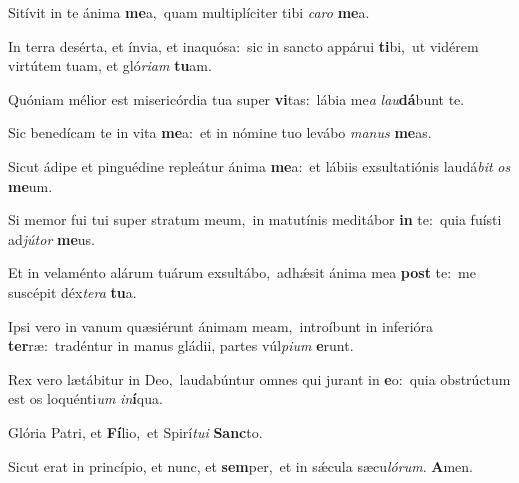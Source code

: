 Sitívit in te ánima \textbf{me}a,~\redgreheightstar quam multiplíciter tibi \textit{ca}\textit{ro} \textbf{me}a.

In terra desérta, et ínvia, et inaquósa:~\reddagger sic in sancto appárui \textbf{ti}bi,~\redgreheightstar ut vidérem virtútem tuam, et gló\textit{ri}\textit{am} \textbf{tu}am.

Quóniam mélior est misericórdia tua super \textbf{vi}tas:~\redgreheightstar lábia me\textit{a} \textit{lau}\textbf{dá}bunt te.

Sic benedícam te in vita \textbf{me}a:~\redgreheightstar et in nómine tuo levábo \textit{ma}\textit{nus} \textbf{me}as.

Sicut ádipe et pinguédine repleátur ánima \textbf{me}a:~\redgreheightstar et lábiis exsultatiónis laudá\textit{bit} \textit{os} \textbf{me}um.

Si memor fui tui super stratum meum,~\reddagger in matutínis meditábor \textbf{in} te:~\redgreheightstar quia fuísti ad\textit{jú}\textit{tor} \textbf{me}us.

Et in velaménto alárum tuárum exsultábo,~\reddagger adhǽsit ánima mea \textbf{post} te:~\redgreheightstar me suscépit déx\textit{te}\textit{ra} \textbf{tu}a.

Ipsi vero in vanum quæsiérunt ánimam meam,~\reddagger introíbunt in inferióra \textbf{ter}ræ:~\redgreheightstar tradéntur in manus gládii, partes vúl\textit{pi}\textit{um} \textbf{e}runt.

Rex vero lætábitur in Deo,~\reddagger laudabúntur omnes qui jurant in \textbf{e}o:~\redgreheightstar quia obstrúctum est os loquénti\textit{um} \textit{in}\textbf{í}qua.

Glória Patri, et \textbf{Fí}lio,~\redgreheightstar et Spirí\textit{tu}\textit{i} \textbf{Sanc}to.

Sicut erat in princípio, et nunc, et \textbf{sem}per,~\redgreheightstar et in sǽcula sæcu\textit{ló}\textit{rum}. \textbf{A}men.

